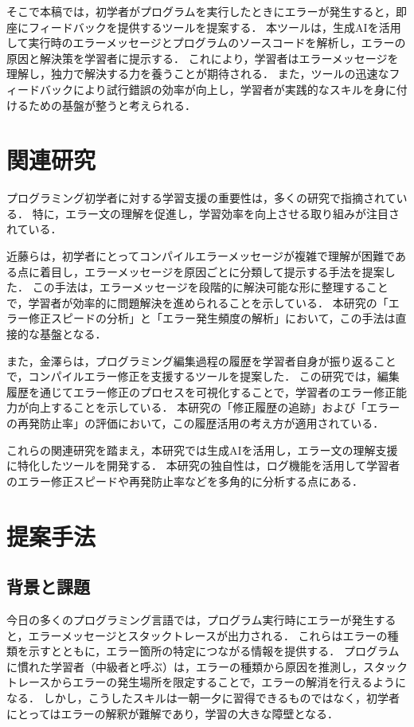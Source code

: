 \documentclass[12pt,twoside]{jbook}
\begin{document}
そこで本稿では，初学者がプログラムを実行したときにエラーが発生すると，即座にフィードバックを提供するツールを提案する．
本ツールは，生成AIを活用して実行時のエラーメッセージとプログラムのソースコードを解析し，エラーの原因と解決策を学習者に提示する\cite{2023jssst_tanaka}．
これにより，学習者はエラーメッセージを理解し，独力で解決する力を養うことが期待される．
また，ツールの迅速なフィードバックにより試行錯誤の効率が向上し，学習者が実践的なスキルを身に付けるための基盤が整うと考えられる．

\chapter{関連研究}
プログラミング初学者に対する学習支援の重要性は，多くの研究で指摘されている．
特に，エラー文の理解を促進し，学習効率を向上させる取り組みが注目されている．

近藤ら\cite{2023repit_kondo}は，初学者にとってコンパイルエラーメッセージが複雑で理解が困難である点に着目し，エラーメッセージを原因ごとに分類して提示する手法を提案した．
この手法は，エラーメッセージを段階的に解決可能な形に整理することで，学習者が効率的に問題解決を進められることを示している．
本研究の「エラー修正スピードの分析」と「エラー発生頻度の解析」において，この手法は直接的な基盤となる．

また，金澤ら\cite{2019ipsj_kanazawa}は，プログラミング編集過程の履歴を学習者自身が振り返ることで，コンパイルエラー修正を支援するツールを提案した．
この研究では，編集履歴を通じてエラー修正のプロセスを可視化することで，学習者のエラー修正能力が向上することを示している．
本研究の「修正履歴の追跡」および「エラーの再発防止率」の評価において，この履歴活用の考え方が適用されている．

これらの関連研究を踏まえ，本研究では生成AIを活用し，エラー文の理解支援に特化したツールを開発する．
本研究の独自性は，ログ機能を活用して学習者のエラー修正スピードや再発防止率などを多角的に分析する点にある．

\chapter{提案手法}\label{sect:requirements}
\section{背景と課題}
今日の多くのプログラミング言語では，プログラム実行時にエラーが発生すると，エラーメッセージとスタックトレースが出力される．
これらはエラーの種類を示すとともに，エラー箇所の特定につながる情報を提供する．
プログラムに慣れた学習者（中級者と呼ぶ）は，エラーの種類から原因を推測し，スタックトレースからエラーの発生場所を限定することで，エラーの解消を行えるようになる．
しかし，こうしたスキルは一朝一夕に習得できるものではなく，初学者にとってはエラーの解釈が難解であり，学習の大きな障壁となる\cite{2012ies_sakakibara}．
\end{document}
